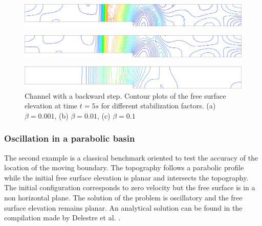 \begin{figure}[H]
    \begin{subfigure}{.05\textwidth}
        \caption{}
    \end{subfigure}
    \begin{minipage}[c]{.94\textwidth}
        \includegraphics[width=\textwidth]{img/eulerian/step/stab_0.001_time_5.pdf}
    \end{minipage}
    \par\medskip
    \begin{subfigure}{.05\textwidth}
        \caption{}
    \end{subfigure}
    \begin{minipage}[c]{.94\textwidth}
        \includegraphics[width=\textwidth]{img/eulerian/step/stab_0.01_time_5.pdf}
    \end{minipage}
    \par\medskip
    \begin{subfigure}{.05\textwidth}
        \caption{}
    \end{subfigure}
    \begin{minipage}[c]{.94\textwidth}
        \includegraphics[width=\textwidth]{img/eulerian/step/stab_0.1_time_5.pdf}
    \end{minipage}
\caption{Channel with a backward step. Contour plots of the free surface elevation at time $t=5s$ for different stabilization factors. (a) $\beta=0.001$, (b) $\beta=0.01$, (c) $\beta=0.1$}
\label{stab_parameters_time2}
\end{figure}



\subsubsection{Oscillation in a parabolic basin}

The second example is a classical benchmark oriented to test the accuracy of the location of the moving boundary. The topography follows a parabolic profile while the initial free surface elevation is planar and intersects the topography. The initial configuration corresponds to zero velocity but the free surface is in a non horizontal plane. The solution of the problem is oscillatory and the free surface elevation remains planar. An analytical solution can be found in the compilation made by Delestre et al. \cite{delestre2013}.

